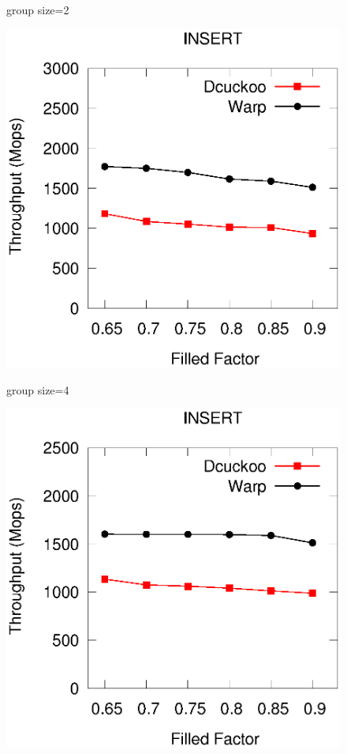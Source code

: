 \begin{figure}[htp]
\begin{minipage}{0.16\linewidth}
		\centerline{group size=2}
	\end{minipage}
	\begin{minipage}{0.16\linewidth}\centering
		\includegraphics[width=\linewidth]{pic/group-size/g4-insert.eps}
		\centerline{group size=4}
	\end{minipage}
	\begin{minipage}{0.16\linewidth}\centering
		\includegraphics[width=\linewidth]{pic/group-size/g8-insert.eps}

\end{minipage}
\end{figure}
